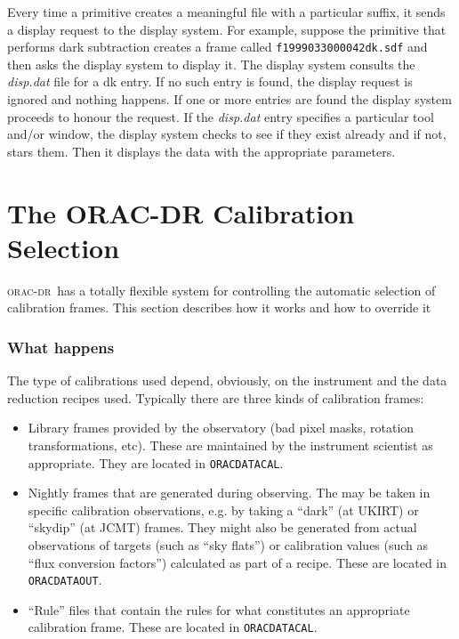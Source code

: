 \documentclass[twoside,11pt]{article}
\newcommand{\xlabel}[1]{}
\renewcommand{\_}{\texttt{\symbol{95}}}
\newcommand{\oracdr}{\textsc{orac-dr}}
\begin{document}
Every time a primitive creates a meaningful file with a particular
suffix, it sends a display request to the display system. For example, 
suppose the primitive that performs dark subtraction creates a frame
called \texttt{f19990330\_00042\_dk.sdf} and then asks the display system to
display it. The display system consults the \emph{disp.dat} file for a dk
entry. If no such entry is found, the display request is ignored and
nothing happens. If one or more entries are found the display system
proceeds to honour the request. If the \emph{disp.dat} entry specifies a
particular tool and/or window, the display system checks to see if
they exist already and if not, stars them. Then it displays the data
with the appropriate parameters.

\section{\xlabel{calibration_selection}The ORAC-DR Calibration Selection\label{The_ORAC-DR_Calibration_Selection}}

\oracdr\ has a totally flexible system for controlling the automatic
selection of calibration frames. This section describes how it works and
how to override it

\subsubsection*{What happens\label{The_ORAC-DR_Calibration_Selection_What_happens}}

The type of calibrations used depend, obviously, on the instrument and
the data reduction recipes used. Typically there are three kinds of
calibration frames:

\begin{itemize}
\item 

Library frames provided by the observatory (bad pixel masks, rotation
transformations, etc). These are maintained by the instrument
scientist as appropriate. They are located in \texttt{ORAC\_DATA\_CAL}.

\item 

Nightly frames that are generated during observing. The may be taken
in specific calibration observations, e.g. by taking a ``dark'' (at UKIRT)
or ``skydip'' (at JCMT) frames. They might also be generated from
actual observations of targets (such as ``sky flats'') or
calibration values (such as ``flux conversion factors'') calculated
as part of a recipe. These are located in \texttt{ORAC\_DATA\_OUT}.

\item 

``Rule'' files that contain the rules for what constitutes an
appropriate calibration frame. These are located in \texttt{ORAC\_DATA\_CAL}.

\end{itemize}
\end{document}
